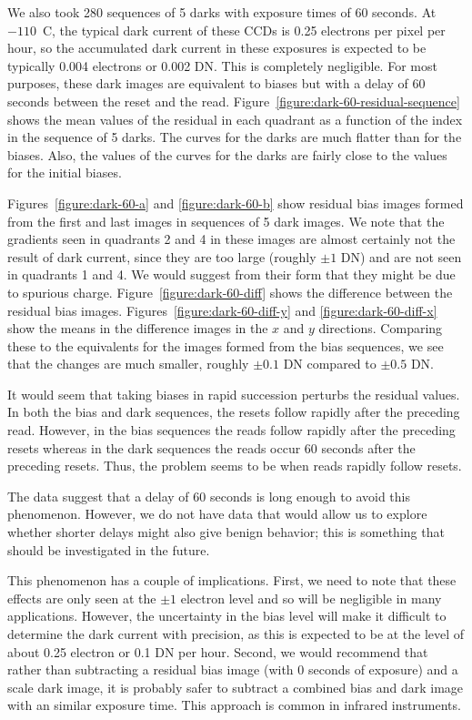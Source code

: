 \documentclass{article}
\begin{document}
We also took 280 sequences of 5 darks with exposure times of 60 seconds. At $-110$~C, the typical dark current of these CCDs is 0.25 electrons per pixel per hour, so the accumulated dark current in these exposures is expected to be typically 0.004 electrons or 0.002 DN. This is completely negligible. For most purposes, these dark images are equivalent to biases but with a delay of 60 seconds between the reset and the read. Figure~\ref{figure:dark-60-residual-sequence} shows the mean values of the residual in each quadrant as a function of the index in the sequence of 5 darks. The curves for the darks are much flatter than for the biases. Also, the values of the curves for the darks are fairly close to the values for the initial biases.

Figures~\ref{figure:dark-60-a} and \ref{figure:dark-60-b} show residual bias images formed from the first and last images in sequences of 5 dark images. We note that the gradients seen in quadrants 2 and 4 in these images are almost certainly not the result of dark current, since they are too large (roughly $\pm1$ DN) and are not seen in quadrants 1 and 4. We would suggest from their form that they might be due to spurious charge. Figure~\ref{figure:dark-60-diff} shows the difference between the residual bias images. Figures~\ref{figure:dark-60-diff-y} and \ref{figure:dark-60-diff-x} show the means in the difference images in the $x$ and $y$ directions. Comparing these to the equivalents for the images formed from the bias sequences, we see that the changes are much smaller, roughly $\pm0.1$ DN compared to $\pm0.5$ DN. 

It would seem that taking biases in rapid succession perturbs the residual values. In both the bias and dark sequences, the resets follow rapidly after the preceding read. However, in the bias sequences the reads follow rapidly after the preceding resets whereas in the dark sequences the reads occur 60 seconds after the preceding resets. Thus, the problem seems to be when reads rapidly follow resets.

The data suggest that a delay of 60 seconds is long enough to avoid this phenomenon. However, we do not have data that would allow us to explore whether shorter delays might also give benign behavior; this is something that should be investigated in the future.

This phenomenon has a couple of implications. First, we need to note that these effects are only seen at the $\pm1$ electron level and so will be negligible in many applications. However, the uncertainty in the bias level will make it difficult to determine the dark current with precision, as this is expected to be at the level of about 0.25 electron or 0.1 DN per hour. Second, we would recommend that rather than subtracting a residual bias image (with 0 seconds of exposure) and a scale dark image, it is probably safer to subtract a combined bias and dark image with an similar exposure time. This approach is common in infrared instruments. 
\end{document}
